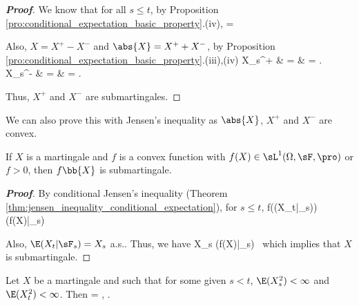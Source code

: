 \begin{proof}[\bf Proof]
We know that for all $s\leq t$, by Proposition \ref{pro:conditional_expectation_basic_property}.(iv),
\be
{} =  \leq \E{} \ \ra \  
\ee

Also, $X = X^+ - X^-$ and $\abs{X} = X^+ + X^-$, by Proposition \ref{pro:conditional_expectation_basic_property}.(iii),(iv)
\beast
X_s^+ & = &   \leq {}  = \E {} .\\
X_s^- & = &   \leq {}  = \E {} .
\eeast

Thus, $X^+$ and $X^-$ are submartingales.
\end{proof}

\begin{remark}
We can also prove this with Jensen's inequality as $\abs{X}$, $X^+$ and $X^-$ are convex.
\end{remark}

\begin{proposition}\label{pro:convex_implies_submartingale}
If $X$ is a martingale and $f$ is a convex function with $f(X) \in \sL^1(\Omega,\sF,\pro)$ or $f > 0$, then $f\bb{X}$ is submartingale.
\end{proposition}

\begin{proof}[\bf Proof]
By conditional Jensen's inequality (Theorem \ref{thm:jensen_inequality_conditional_expectation}), for $s\leq t$,
\be
f(\E(X_t|\sF_s)) \leq \E(f(X)|\sF_s)\ 
\ee

Also, $\E(X_t|\sF_s) = X_s$ a.s.. Thus, we have
\be
X_s \leq \E(f(X)|\sF_s)\ 
\ee
which implies that $X$ is submartingale.
\end{proof}


\begin{lemma}\label{lem:sl2_martingale_trick}
Let $X$ be a martingale and such that for some given $s < t$, $\E(X^2_s ) < \infty$ and $\E(X^2_t ) < \infty$. Then
\be
\E{} = \E{}, \quad{}.
\ee
\end{lemma}

